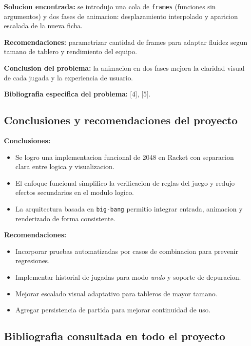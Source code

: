 \documentclass[12pt,a4paper]{article}
\begin{document}
\textbf{Solucion encontrada:}
se introdujo una cola de \texttt{frames} (funciones sin argumentos) y dos fases de animacion:
desplazamiento interpolado y aparicion escalada de la nueva ficha.

\textbf{Recomendaciones:}
parametrizar cantidad de frames para adaptar fluidez segun tamano de tablero y rendimiento del equipo.

\textbf{Conclusion del problema:}
la animacion en dos fases mejora la claridad visual de cada jugada y la experiencia de usuario.

\textbf{Bibliografia especifica del problema:}
[4], [5].

\subsection{Conclusiones y recomendaciones del proyecto}

\textbf{Conclusiones:}
\begin{itemize}
    \item Se logro una implementacion funcional de 2048 en Racket con separacion clara entre logica y visualizacion.
    \item El enfoque funcional simplifico la verificacion de reglas del juego y redujo efectos secundarios en el modulo logico.
    \item La arquitectura basada en \texttt{big-bang} permitio integrar entrada, animacion y renderizado de forma consistente.
\end{itemize}

\textbf{Recomendaciones:}
\begin{itemize}
    \item Incorporar pruebas automatizadas por casos de combinacion para prevenir regresiones.
    \item Implementar historial de jugadas para modo \textit{undo} y soporte de depuracion.
    \item Mejorar escalado visual adaptativo para tableros de mayor tamano.
    \item Agregar persistencia de partida para mejorar continuidad de uso.
\end{itemize}

\subsection{Bibliografia consultada en todo el proyecto}
\end{document}
